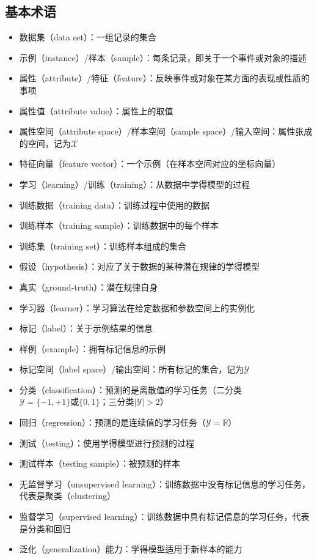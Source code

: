 \documentclass{ctexart}
\begin{document}
				\subsection{基本术语}
					\begin{itemize}
						 \item 数据集（data set）：一组记录的集合
						 \item 示例（instance）/样本（sample）：每条记录，即关于一个事件或对象的描述
						 \item 属性（attribute）/特征（feature）：反映事件或对象在某方面的表现或性质的事项
						 \item 属性值（attribute value）：属性上的取值
						 \item 属性空间（attribute space）/样本空间（sample space）/输入空间：属性张成的空间，记为$\mathcal{X}$
						 \item 特征向量（feature vector）：一个示例（在样本空间对应的坐标向量）
						 \item 学习（learning）/训练（training）：从数据中学得模型的过程
						 \item 训练数据（training data）：训练过程中使用的数据
						 \item 训练样本（training sample）：训练数据中的每个样本
						 \item 训练集（training set）：训练样本组成的集合
						 \item 假设（hypothesis）：对应了关于数据的某种潜在规律的学得模型
						 \item 真实（ground-truth）：潜在规律自身
						 \item 学习器（learner）：学习算法在给定数据和参数空间上的实例化
						 \item 标记（label）：关于示例结果的信息
						 \item 样例（example）：拥有标记信息的示例
						 \item 标记空间（label space）/输出空间：所有标记的集合，记为$\mathcal{Y}$
						 \item 分类（classification）：预测的是离散值的学习任务（二分类$\mathcal{Y}=\{-1,+1\}\textrm{或}\{0,1\}$；三分类$|\mathcal{Y}|>2$）
						 \item 回归（regression）：预测的是连续值的学习任务（$\mathcal{Y}=\mathbb{R}$）
						 \item 测试（testing）：使用学得模型进行预测的过程
						 \item 测试样本（testing sample）：被预测的样本
						 \item 无监督学习（unsupervised learning）：训练数据中没有标记信息的学习任务，代表是聚类（clustering）
						 \item 监督学习（supervised learning）：训练数据中具有标记信息的学习任务，代表是分类和回归
						 \item 泛化（generalization）能力：学得模型适用于新样本的能力
					\end{itemize}
\end{document}

